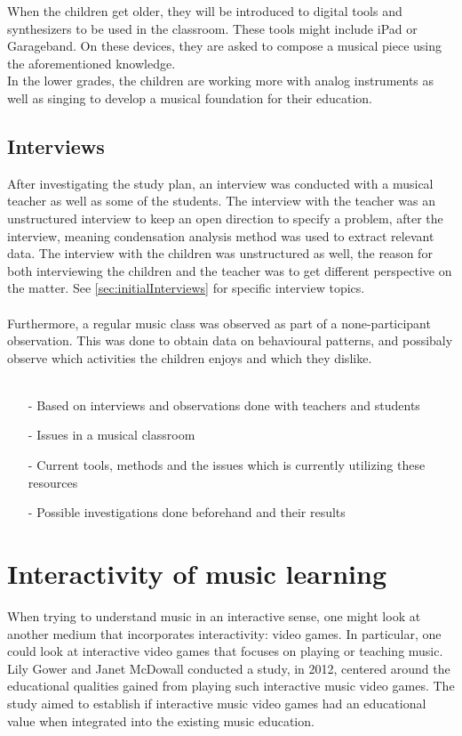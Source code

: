 	When the children get older, they will be introduced to digital tools and synthesizers to be used in the classroom. These tools might include iPad or Garageband. On these devices, they are asked to compose a musical piece using the aforementioned knowledge.\\
	In the lower grades, the children are working more with analog instruments as well as singing to develop a musical foundation for their education.
	\\
	\subsection{Interviews}
	After investigating the study plan, an interview was conducted with a musical teacher as well as some of the students. The interview with the teacher was an unstructured interview to keep an open direction to specify a problem, after the interview, meaning condensation analysis method was used to extract relevant data. The interview with the children was unstructured as well, the reason for both interviewing the children and the teacher was to get different perspective on the matter. See \autoref{sec:initialInterviews} for specific interview topics.
	\\\\
	Furthermore, a regular music class was observed as part of a none-participant observation. This was done to obtain data on behavioural patterns, and possibaly observe which activities the children enjoys and which they dislike. 
	\\\\
	\begin{itemize}
	\item[-] Based on interviews and observations done with teachers and students
	\item[-] Issues in a musical classroom
	\item[-] Current tools, methods and the issues which is currently utilizing these resources
	\item[-] Possible investigations done beforehand and their results	
\end{itemize}

\section{Interactivity of music learning}	
When trying to understand music in an interactive sense, one might look at another medium that incorporates interactivity: video games. In particular, one could look at interactive video games that focuses on playing or teaching music. Lily Gower and Janet McDowall conducted a study, in 2012, centered around the educational qualities gained from playing such interactive music video games\cite{interactiveMusicVideoGames}. The study aimed to establish if interactive music video games had an educational value when integrated into the existing music education.\\

